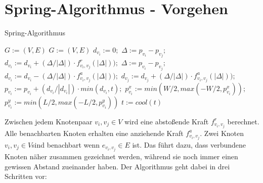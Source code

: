 \section{Spring-Algorithmus - Vorgehen}
\label{Kapitel_3_-_Unterkapitel_2}
%

\begin{algorithm}[t]
	\centering
	\caption[Ein Algorithmus]{Spring-Algorithmus} \label{algo_1}
	\begin{algorithmic}
		\REQUIRE \begin{math} G:= (V,E) \end{math}
		\ENSURE \begin{math} G:= (V,E) \end{math}
		\STATE $d_{v_{i}} := 0;$
		\STATE $\Delta := p_{v_{i}} - p_{v_{j}};$
		\STATE $d_{v_{i}} := d_{v_{i}} + (\Delta / |\Delta|) \cdot f^{r}_{v_{i},v_{j}}(|\Delta|));$
		\ENDIF
		\ENDFOR
		\ENDFOR
		\newline
		\STATE $\Delta := p_{v_{i}} - p_{v_{j}};$
		\STATE $d_{v_{i}} := d_{v_{i}} - (\Delta / |\Delta|) \cdot f^{a}_{v_{i},v_{j}}(|\Delta|));$
		\STATE $d_{v_{j}} := d_{v_{j}} + (\Delta / |\Delta|) \cdot f^{a}_{v_{i},v_{j}}(|\Delta|));$
		\ENDFOR
		\newline
		\STATE $p_{v_{i}} := p_{v_{i}} + ( d_{v_{i}}/ |d_{v_{i}}|) \cdot min ( d_{v_{i}}, t );$
		\STATE $p_{v_{i}}^{x} := min(W/2, max(-W/2, p_{v_{i}}^{x}));$
		\STATE $p_{v_{i}}^{y} := min(L/2, max(-L/2, p_{v_{i}}^{y}))$
		\ENDFOR
		\STATE $t:= cool(t)$
		\ENDFOR
	\end{algorithmic}
\end{algorithm}

Zwischen jedem Knotenpaar $v_{i},v_{j} \in V$ wird eine abstoßende Kraft \begin{math} f^{r}_{v_{i},v_{j}}  \end{math} berechnet.   Alle
benachbarten Knoten erhalten eine anziehende Kraft \begin{math} f^{a}_{v_{i},v_{j}} \end{math}. Zwei Knoten \begin{math} v_{i},v_{j} \in V \end{math}sind benachbart wenn \begin{math} e_{v_{i},v_{j}} \in E \end{math} ist. Das führt dazu, dass verbundene Knoten näher zusammen
gezeichnet werden, während sie noch immer einen gewissen Abstand zueinander
haben. Der Algorithmus geht dabei in drei Schritten vor:

